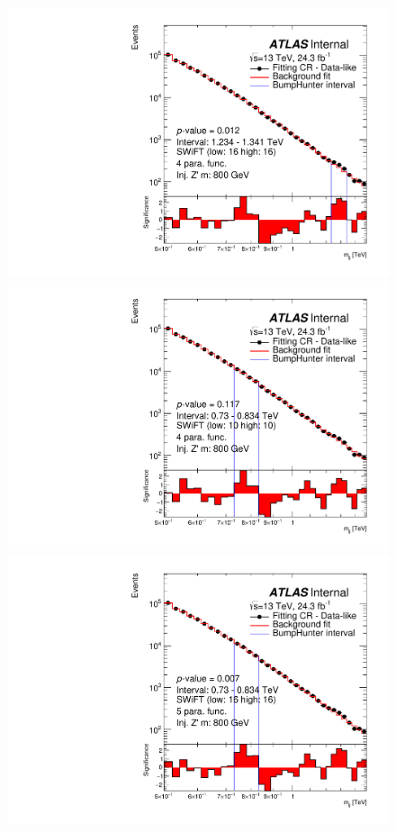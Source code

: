 \begin{figure}[!htb]
\captionsetup[subfigure]{aboveskip=0pt,justification=centering}
\centering
{} {
  \includegraphics[width=0.45\linewidth, angle=0]{figs/Dibjet/LowMass/FitStudy/bhFit_corrFitCR_dataLike_4para_low16_high16_inj_Zprimebb800_xsFactor1.pdf}
}
 {
  \includegraphics[width=0.45\linewidth, angle=0]{figs/Dibjet/LowMass/FitStudy/bhFit_corrFitCR_dataLike_4para_low10_high10_inj_Zprimebb800_xsFactor1.pdf}
}
 {
  \includegraphics[width=0.45\linewidth, angle=0]{figs/Dibjet/LowMass/FitStudy/bhFit_corrFitCR_dataLike_5para_low16_high16_inj_Zprimebb800_xsFactor1.pdf}
}

\end{figure}
